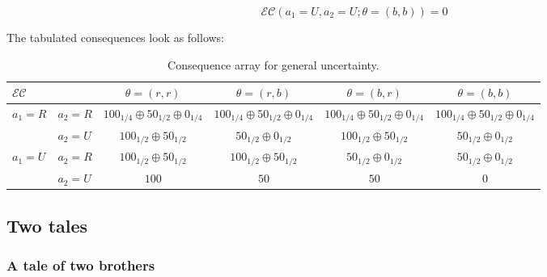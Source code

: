 \documentclass{article}
\theoremstyle{definition}
\begin{document}
\begin{equation}
    \mathcal{EC}(a_1=U,a_2=U;\theta=(b,b)) 
    =
    0
\end{equation}

The tabulated consequences look as follows:

\begin{table}[H]
\begin{center}
\begin{tabular}{|l l|c c c c|}
\hline
\multirow{1}{*}{$\mathcal{EC}$} & & $\theta=(r,r)$ & $\theta=(r,b)$ & $\theta=(b,r)$ & $\theta=(b,b)$\\
\hline
\multirow{2}{*}{$a_1=R$}
  & $a_2=R$ &
  $100_{1/4} \oplus 50_{1/2} \oplus 0_{1/4}$ &
  $100_{1/4} \oplus 50_{1/2} \oplus 0_{1/4}$ &
  $100_{1/4} \oplus 50_{1/2} \oplus 0_{1/4}$ &
  $100_{1/4} \oplus 50_{1/2} \oplus 0_{1/4}$\\
\cline{2-6}
  & $a_2=U$ &
  $100_{1/2} \oplus 50_{1/2}$ &
  $50_{1/2} \oplus 0_{1/2}$ &
  $100_{1/2} \oplus 50_{1/2}$ &
  $50_{1/2} \oplus 0_{1/2}$\\
\hline
\multirow{2}{*}{$a_1=U$}
  & $a_2=R$ &
  $100_{1/2} \oplus 50_{1/2}$ &
  $100_{1/2} \oplus 50_{1/2}$ &
  $50_{1/2} \oplus 0_{1/2}$ &
  $50_{1/2} \oplus 0_{1/2}$\\
\cline{2-6}
  & $a_2=U$ &
  $100$ & $50$ & $50$ & $0$\\
\hline
\end{tabular}
\caption{Consequence array for general uncertainty.}
    \label{tab:ConsequenceSharedUncertainty}
\end{center}
\end{table}


\subsection{Two tales}

\subsubsection{A tale of two brothers}
\end{document}
